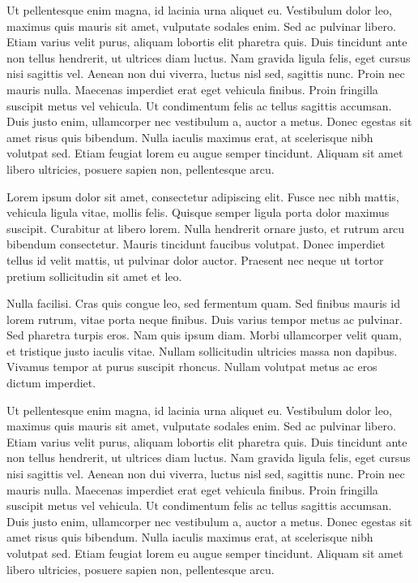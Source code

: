 Ut pellentesque enim magna, id lacinia urna aliquet eu. Vestibulum dolor leo, maximus quis mauris sit amet, vulputate sodales enim. Sed ac pulvinar libero. Etiam varius velit purus, aliquam lobortis elit pharetra quis. Duis tincidunt ante non tellus hendrerit, ut ultrices diam luctus. Nam gravida ligula felis, eget cursus nisi sagittis vel. Aenean non dui viverra, luctus nisl sed, sagittis nunc. Proin nec mauris nulla. Maecenas imperdiet erat eget vehicula finibus. Proin fringilla suscipit metus vel vehicula. Ut condimentum felis ac tellus sagittis accumsan. Duis justo enim, ullamcorper nec vestibulum a, auctor a metus. Donec egestas sit amet risus quis bibendum. Nulla iaculis maximus erat, at scelerisque nibh volutpat sed. Etiam feugiat lorem eu augue semper tincidunt. Aliquam sit amet libero ultricies, posuere sapien non, pellentesque arcu.

Lorem ipsum dolor sit amet, consectetur adipiscing elit. Fusce nec nibh mattis, vehicula ligula vitae, mollis felis. Quisque semper ligula porta dolor maximus suscipit. Curabitur at libero lorem. Nulla hendrerit ornare justo, et rutrum arcu bibendum consectetur. Mauris tincidunt faucibus volutpat. Donec imperdiet tellus id velit mattis, ut pulvinar dolor auctor. Praesent nec neque ut tortor pretium sollicitudin sit amet et leo.

Nulla facilisi. Cras quis congue leo, sed fermentum quam. Sed finibus mauris id lorem rutrum, vitae porta neque finibus. Duis varius tempor metus ac pulvinar. Sed pharetra turpis eros. Nam quis ipsum diam. Morbi ullamcorper velit quam, et tristique justo iaculis vitae. Nullam sollicitudin ultricies massa non dapibus. Vivamus tempor at purus suscipit rhoncus. Nullam volutpat metus ac eros dictum imperdiet.

Ut pellentesque enim magna, id lacinia urna aliquet eu. Vestibulum dolor leo, maximus quis mauris sit amet, vulputate sodales enim. Sed ac pulvinar libero. Etiam varius velit purus, aliquam lobortis elit pharetra quis. Duis tincidunt ante non tellus hendrerit, ut ultrices diam luctus. Nam gravida ligula felis, eget cursus nisi sagittis vel. Aenean non dui viverra, luctus nisl sed, sagittis nunc. Proin nec mauris nulla. Maecenas imperdiet erat eget vehicula finibus. Proin fringilla suscipit metus vel vehicula. Ut condimentum felis ac tellus sagittis accumsan. Duis justo enim, ullamcorper nec vestibulum a, auctor a metus. Donec egestas sit amet risus quis bibendum. Nulla iaculis maximus erat, at scelerisque nibh volutpat sed. Etiam feugiat lorem eu augue semper tincidunt. Aliquam sit amet libero ultricies, posuere sapien non, pellentesque arcu.

